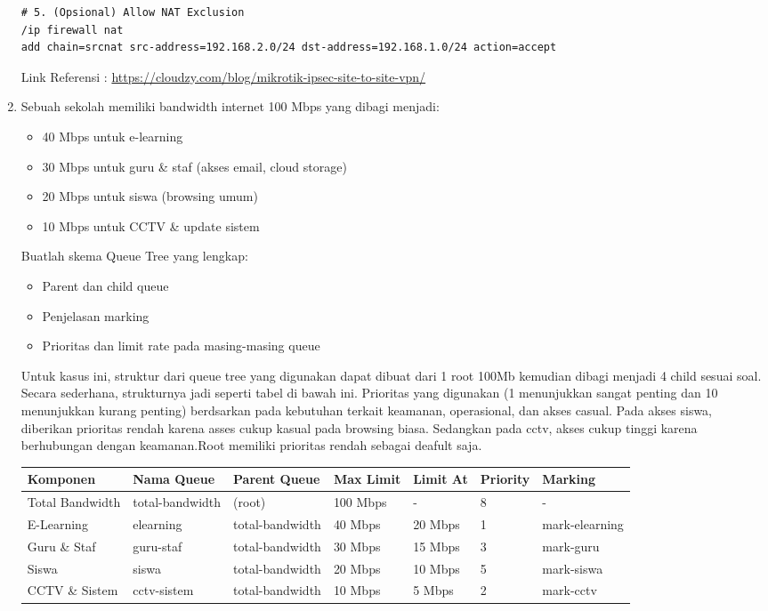 \begin{enumerate}
\begin{verbatim}
# 5. (Opsional) Allow NAT Exclusion
/ip firewall nat
add chain=srcnat src-address=192.168.2.0/24 dst-address=192.168.1.0/24 action=accept
\end{verbatim}

	Link Referensi : \url{https://cloudzy.com/blog/mikrotik-ipsec-site-to-site-vpn/}

	\item Sebuah sekolah memiliki bandwidth internet 100 Mbps yang dibagi menjadi:
	\begin{itemize}
		\item 40 Mbps untuk e-learning
		\item 30 Mbps untuk guru \& staf (akses email, cloud storage)
		\item 20 Mbps untuk siswa (browsing umum)
		\item 10 Mbps untuk CCTV \& update sistem
	\end{itemize}
	Buatlah skema Queue Tree yang lengkap:
	\begin{itemize}
		\item Parent dan child queue
		\item Penjelasan marking
		\item Prioritas dan limit rate pada masing-masing queue
	\end{itemize}

	Untuk kasus ini, struktur dari queue tree yang digunakan dapat dibuat dari 1 root 100Mb kemudian dibagi menjadi 4 child sesuai soal. Secara sederhana, strukturnya jadi seperti tabel di bawah ini. Prioritas yang digunakan (1 menunjukkan sangat penting dan 10 menunjukkan kurang penting) berdsarkan pada kebutuhan terkait keamanan, operasional, dan akses casual. Pada akses siswa, diberikan prioritas rendah karena asses cukup kasual pada browsing biasa. Sedangkan pada cctv, akses cukup tinggi karena berhubungan dengan keamanan.Root memiliki prioritas rendah sebagai deafult saja. 
	\begin{table}[htbp]
\centering
\begin{tabular}{|l|l|l|l|l|l|l|}
\hline
\textbf{Komponen} & \textbf{Nama Queue} & \textbf{Parent Queue} & \textbf{Max Limit} & \textbf{Limit At} & \textbf{Priority} & \textbf{Marking}\\
\hline
Total Bandwidth & total-bandwidth & (root) & 100 Mbps & - & 8 & -\\
\hline
E-Learning & elearning & total-bandwidth & 40 Mbps & 20 Mbps & 1 & mark-elearning\\
\hline
Guru \& Staf & guru-staf & total-bandwidth & 30 Mbps & 15 Mbps & 3 & mark-guru\\
\hline
Siswa & siswa & total-bandwidth & 20 Mbps & 10 Mbps & 5 & mark-siswa\\
\hline
CCTV \& Sistem & cctv-sistem & total-bandwidth & 10 Mbps & 5 Mbps & 2 & mark-cctv \\
\hline
\end{tabular}
\end{table}


\end{enumerate}

